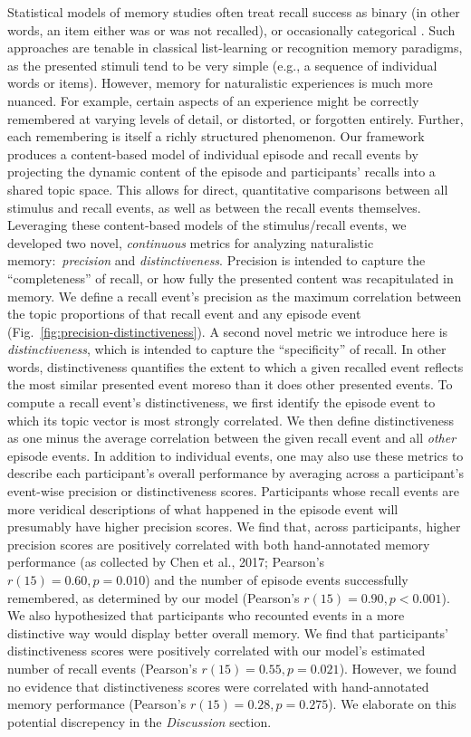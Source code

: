 \documentclass{article}
\begin{document}
Statistical models of memory studies often treat recall success as binary (in other words, an item either was or was not recalled), or occasionally categorical \citep[e.g., to distinguish familiarity from recollection;][]{YoneEtal02}.  Such approaches are tenable in classical list-learning or recognition memory paradigms, as the presented stimuli tend to be very simple (e.g., a sequence of individual words or items).  However, memory for naturalistic experiences is much more nuanced.  For example, certain aspects of an experience might be correctly remembered at varying levels of detail, or distorted, or forgotten entirely.  Further, each remembering is itself a richly structured phenomenon.  Our framework produces a content-based model of individual episode and recall events by projecting the dynamic content of the episode and participants' recalls into a shared topic space.  This allows for direct, quantitative comparisons between all stimulus and recall events, as well as between the recall events themselves.  Leveraging these content-based models of the stimulus/recall events, we developed two novel, \textit{continuous} metrics for analyzing naturalistic memory:~\textit{precision} and \textit{distinctiveness}.  Precision is intended to capture the ``completeness'' of recall, or how fully the presented content was recapitulated in memory.  We define a recall event's precision as the maximum correlation between the topic proportions of that recall event and any episode event (Fig.~\ref{fig:precision-distinctiveness}).  A second novel metric we introduce here is \textit{distinctiveness}, which is intended to capture the ``specificity'' of recall.  In other words, distinctiveness quantifies the extent to which a given recalled event reflects the most similar presented event moreso than it does other presented events.  To compute a recall event's distinctiveness, we first identify the episode event to which its topic vector is most strongly correlated.  We then define distinctiveness as one minus the average correlation between the given recall event and all \textit{other} episode events.  In addition to individual events, one may also use these metrics to describe each participant's overall performance by averaging across a participant's event-wise precision or distinctiveness scores.  Participants whose recall events are more veridical descriptions of what happened in the episode event will presumably have higher precision scores. We find that, across participants, higher precision scores are positively correlated with both hand-annotated memory performance (as collected by Chen et al., 2017; Pearson's $r(15) = 0.60, p = 0.010$) and the number of episode events successfully remembered, as determined by our model (Pearson's $r(15) = 0.90, p < 0.001$).  We also hypothesized that participants who recounted events in a more distinctive way would display better overall memory.  We find that participants' distinctiveness scores were positively
correlated with our model's estimated number of recall events (Pearson's $r(15) = 0.55, p = 0.021$).  However, we found no evidence that distinctiveness scores were correlated with hand-annotated memory performance (Pearson's $r(15) = 0.28, p = 0.275$).  We elaborate on this potential discrepency in the \textit{Discussion} section.
\end{document}
